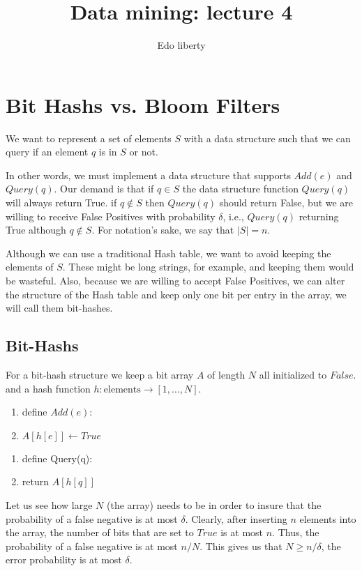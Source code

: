 \documentclass{article}
\title{Data mining: lecture 4} %
\author{Edo liberty}
\date{\nonumber}
\newcommand{\tab}{\hspace{.5cm}}
\begin{document}
\maketitle
\section*{Bit Hashs vs. Bloom Filters}

We want to represent a set of elements $S$ with a data structure such that
we can query if an element $q$ is in $S$ or not.

In other words, we must implement a data structure that supports $Add(e)$ and 
$Query(q)$. Our demand is that if $q\in S$ the data structure function $Query(q)$ will always return True.
if $q \not\in S$ then $Query(q)$ should return False, but we are willing to receive False Positives with probability $\delta$, i.e., $Query(q)$ returning True although $q \not\in S$.
For notation's sake, we say that $|S| = n$.

Although we can use a traditional Hash table, we want to avoid keeping the elements of $S$.
These might be long strings, for example, and keeping them would be wasteful.  
Also, because we are willing to accept False Positives, we can alter the structure of the Hash table 
and keep only one bit per entry in the array, we will call them bit-hashes.

\subsection*{Bit-Hashs}
For a bit-hash structure we keep a bit array $A$ of length $N$ all initialized to $False$.
and a hash function $h: \mbox{elements} \rightarrow [1,\ldots,N]$.

\begin{enumerate}
\item define  $Add(e)$:
\item \tab $A[h[e]] \leftarrow True$ 
\end{enumerate}


\begin{enumerate}
\item define  Query(q):
\item \tab return $A[h[q]]$ 
\end{enumerate}

Let us see how large $N$ (the array) needs to be in order to insure that the probability of a 
false negative is at most $\delta$. 
Clearly, after inserting $n$ elements into the array, the number of bits that are set to $True$ 
is at most $n$. Thus, the probability of a false negative is at most $n/N$.
This gives us that $N \ge n/\delta$, the error probability is at most $\delta$.
\end{document}

